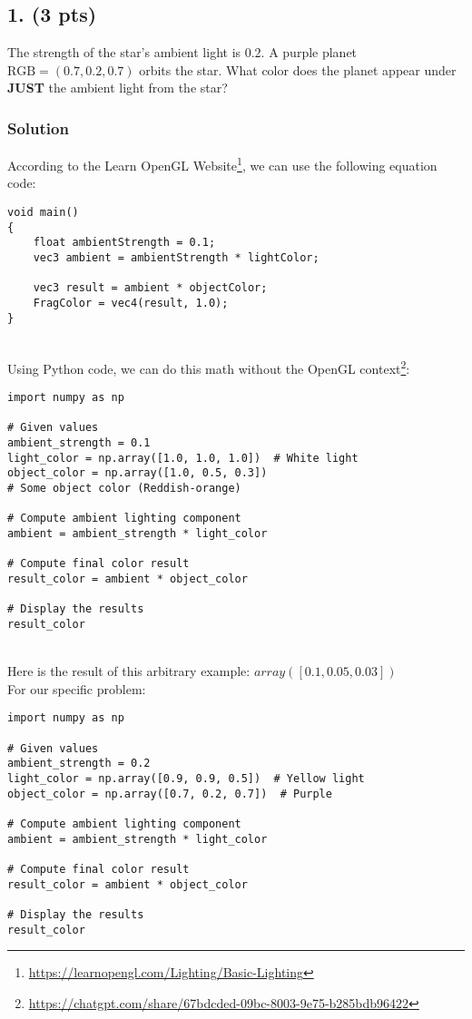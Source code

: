 \documentclass{article}
\begin{document}
\subsection*{1. (3 pts)}
The strength of the star’s ambient light is \(0.2\). A purple planet \(\text{RGB}=(0.7, 0.2, 0.7)\) orbits the star. What color does the planet appear under \textbf{JUST} the ambient light from the star?

\subsubsection{Solution}
According to the Learn OpenGL Website\footnote{\url{https://learnopengl.com/Lighting/Basic-Lighting}}, we can use the following equation code:\\ 
\begin{verbatim}
void main()
{
    float ambientStrength = 0.1;
    vec3 ambient = ambientStrength * lightColor;

    vec3 result = ambient * objectColor;
    FragColor = vec4(result, 1.0);
}  
\end{verbatim}
\\ Using Python code, we can do this math without the OpenGL context\footnote{\url{https://chatgpt.com/share/67bdcded-09bc-8003-9e75-b285bdb96422}}: \\ 

\begin{verbatim}
import numpy as np

# Given values
ambient_strength = 0.1
light_color = np.array([1.0, 1.0, 1.0])  # White light
object_color = np.array([1.0, 0.5, 0.3])  
# Some object color (Reddish-orange)

# Compute ambient lighting component
ambient = ambient_strength * light_color

# Compute final color result
result_color = ambient * object_color

# Display the results
result_color
\end{verbatim} 
\\Here is the result of this arbitrary example: $array([0.1 , 0.05, 0.03])$ \\

For our specific problem: \\

\begin{verbatim}
import numpy as np

# Given values
ambient_strength = 0.2
light_color = np.array([0.9, 0.9, 0.5])  # Yellow light
object_color = np.array([0.7, 0.2, 0.7])  # Purple

# Compute ambient lighting component
ambient = ambient_strength * light_color

# Compute final color result
result_color = ambient * object_color

# Display the results
result_color
\end{verbatim}
\end{document}
